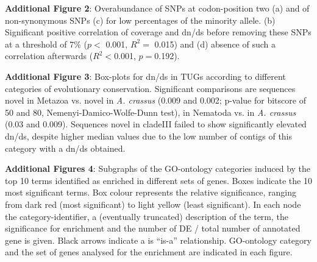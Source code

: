 \documentclass[10pt]{bmc_article}
\newenvironment{bmcformat}{\begin{raggedright}\baselineskip20pt\sloppy\setboolean{publ}{false}}{\end{raggedright}\baselineskip20pt\sloppy}
\begin{document}
\begin{bmcformat}
\textbf{Additional Figure 2}: Overabundance of SNPs at codon-position two (a)
and of non-synonymous SNPs (c) for low percentages of the minority
allele. (b) Significant positive correlation of coverage and dn/ds
before removing these SNPs at a threshold of 7\% ($p<$ 0.001, $R^2=$
0.015) and (d) absence of such a
correlation afterwards ($R^2<$0.001,
$p=$0.192).

\textbf{Additional Figure 3}: Box-plots for dn/ds in TUGs according to
different categories of evolutionary conservation. Significant
comparisons are sequences novel in Metazoa vs. novel in
\textit{A. crassus} (0.009 and 0.002; p-value for bitscore of 50 and
80, Nemenyi-Damico-Wolfe-Dunn test), in Nematoda vs. in
\textit{A. crassus} (0.03 and 0.009). Sequences novel in cladeIII
failed to show significantly elevated dn/ds, despite higher median
values due to the low number of contigs of this category with a dn/ds
obtained.

\textbf{Additional Figures 4}: Subgraphs of the GO-ontology categories
induced by the top 10 terms identified as enriched in different sets
of genes. Boxes indicate the 10 most significant terms. Box colour
represents the relative significance, ranging from dark red (most
significant) to light yellow (least significant). In each node the
category-identifier, a (eventually truncated) description of the term,
the significance for enrichment and the number of DE / total number of
annotated gene is given. Black arrows indicate a is ``is-a''
relationship. GO-ontology category and the set of genes analysed for
the enrichment are indicated in each figure.

\end{bmcformat}
\end{document}

